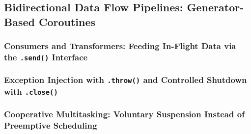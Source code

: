 \subsection{Bidirectional Data Flow Pipelines: Generator-Based Coroutines}
\subsubsection{Consumers and Transformers: Feeding In-Flight Data via the \texttt{.send()} Interface}
\subsubsection{Exception Injection with \texttt{.throw()} and Controlled Shutdown with \texttt{.close()}}
\subsubsection{Cooperative Multitasking: Voluntary Suspension Instead of Preemptive Scheduling}

